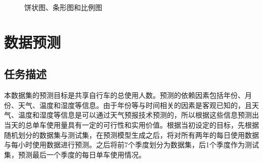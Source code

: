 \documentclass[CJK]{ctexart}
\begin{document}
    \begin{figure}[htbp]
        \centering
        \centering
        \caption{饼状图、条形图和比例图}
    \end{figure}

\section{数据预测}
\subsection{任务描述}
本数据集的预测目标是共享自行车的总使用人数。预测的依赖因素包括年份、月份、天气、温度和湿度等信息。由于年份等与时间相关的因素是客观已知的，且天气、温度和湿度等信息是可以通过天气预报技术预测的，所以根据这些信息预测出当天的总单车使用量具有一定的可行性和实用价值。根据当初设定的目标，先根据随机划分的数据集与测试集，在预测模型生成之后，将对所有两年的每日使用数据与每小时使用数据进行预测。之后将前7个季度划分为数据集，后1个季度作为测试集，预测最后一个季度的每日单车使用情况。
\end{document}
